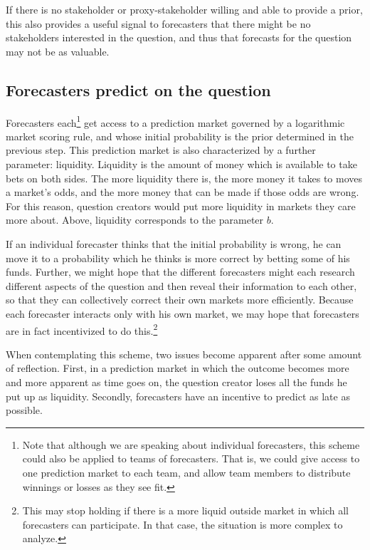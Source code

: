 \documentclass[]{article}
\begin{document}
If there is no stakeholder or proxy-stakeholder willing and able to
provide a prior, this also provides a useful signal to forecasters that
there might be no stakeholders interested in the question, and thus that
forecasts for the question may not be as valuable.

\hypertarget{forecasters-predict-on-the-question}{%
\subsection{Forecasters predict on the
question}\label{forecasters-predict-on-the-question}}

Forecasters
each\footnote{Note that although we are speaking about individual forecasters, this scheme could also be applied to teams of forecasters. That is, we could give access to one prediction market to each team, and allow team members to distribute winnings or losses as they see fit.}
get access to a prediction market governed by a logarithmic market
scoring rule, and whose initial probability is the prior determined in
the previous step. This prediction market is also characterized by a
further parameter: liquidity. Liquidity is the amount of money which is
available to take bets on both sides. The more liquidity there is, the
more money it takes to moves a market's odds, and the more money that
can be made if those odds are wrong. For this reason, question creators
would put more liquidity in markets they care more about. Above,
liquidity corresponds to the parameter \(b\).

If an individual forecaster thinks that the initial probability is
wrong, he can move it to a probability which he thinks is more correct
by betting some of his funds. Further, we might hope that the different
forecasters might each research different aspects of the question and
then reveal their information to each other, so that they can
collectively correct their own markets more efficiently. Because each
forecaster interacts only with his own market, we may hope that
forecasters are in fact incentivized to do
this.\footnote{This may stop holding if there is a more liquid outside market in which all forecasters can participate. In that case, the situation is more complex to analyze.}

When contemplating this scheme, two issues become apparent after some
amount of reflection. First, in a prediction market in which the outcome
becomes more and more apparent as time goes on, the question creator
loses all the funds he put up as liquidity. Secondly, forecasters have
an incentive to predict as late as possible.
\end{document}
